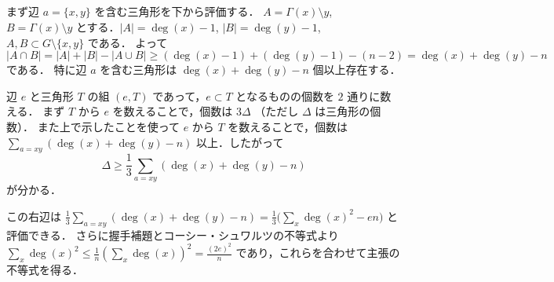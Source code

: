 \subsection{}
まず辺 $a=\{x,y\}$ を含む三角形を下から評価する．
$A = \Gamma(x)\setminus y$, $B=\Gamma(x)\setminus y$ とする．$|A| = \deg(x) - 1$, $|B| = \deg(y) - 1$, $A,B\subset G\setminus\{x,y\}$ である．
よって $|A\cap B| = |A| + |B| - |A\cup B| \geq (\deg(x)-1) + (\deg(y)-1) - (n-2) = \deg(x) + \deg(y) - n$ である．
特に辺 $a$ を含む三角形は $\deg(x) + \deg(y) - n$ 個以上存在する．

辺 $e$ と三角形 $T$ の組 $(e,T)$ であって，$e\subset T$ となるものの個数を $2$ 通りに数える．
まず $T$ から $e$ を数えることで，個数は $3\Delta$ （ただし $\Delta$ は三角形の個数）．
また上で示したことを使って $e$ から $T$ を数えることで，個数は
$\sum_{a=xy}(\deg(x)+\deg(y)-n)$ 以上．したがって
\[
 \Delta\geq \frac13\sum_{a=xy}(\deg(x)+\deg(y)-n)
\]
が分かる．

この右辺は $\frac13\sum_{a=xy}(\deg(x)+\deg(y)-n)=\frac13\bigl(\sum_x \deg(x)^2 - en)$ と評価できる．
さらに握手補題とコーシー・シュワルツの不等式より
$\sum_x \deg(x)^2 \leq \frac1n (\sum_x\deg(x))^2 = \frac{(2e)^2}{n}$ であり，これらを合わせて主張の不等式を得る．
